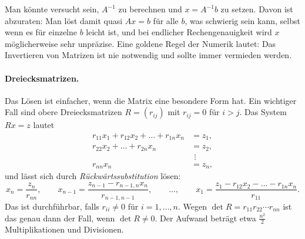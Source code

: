 \documentclass[11pt]{article}
\begin{document}
\begin{ergaenzung}
Man könnte versucht sein, $A^{-1}$ zu berechnen und $x = A^{-1} b$ zu setzen. Davon ist abzuraten: Man löst damit quasi $Ax = b$ für alle $b$, was schwierig sein kann, selbst wenn es für einzelne $b$ leicht ist, und bei endlicher Rechengenauigkeit wird $x$ möglicherweise sehr unpräzise. Eine goldene Regel der Numerik lautet: Das Invertieren von Matrizen ist nie notwendig und sollte immer vermieden werden.

\paragraph{Dreiecksmatrizen.}
Das Lösen ist einfacher, wenn die Matrix eine besondere Form hat. Ein wichtiger Fall sind obere Dreiecksmatrizen $R = (r_{ij})$ mit $r_{ij} = 0$ für $i > j$. Das System $Rx = z$ lautet
\begin{align*}
  r_{11} x_1 + r_{12} x_2 + \dots + r_{1n} x_n &= z_1, \\
  r_{22} x_2 + \dots + r_{2n} x_n &= z_2, \\
  &\ \,\vdots \\
  r_{nn} x_n &= z_n,
\end{align*}
und lässt sich durch \emph{Rückwärtssubstitution} lösen:
\[ x_n = \frac{z_n}{r_{nn}}, \qquad x_{n-1} = \frac{z_{n-1} - r_{n-1,n} x_n}{r_{n-1,n-1}}, \qquad \dots, \qquad x_1 = \frac{z_1 - r_{12} x_2 - \dots - r_{1n} x_n}{r_{11}}. \]
Das ist durchführbar, falls $r_{ii} \neq 0$ für $i = 1, \dots, n$. Wegen $\det R = r_{11} r_{22} \dotsm r_{nn}$ ist das genau dann der Fall, wenn $\det R \neq 0$. Der Aufwand beträgt etwa $\frac{n^2}{2}$ Multiplikationen und Divisionen.
\end{ergaenzung}
\end{document}
